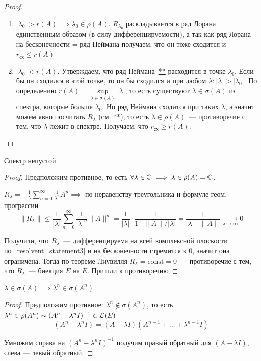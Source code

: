 \begin{proof}
\begin{enumerate}
    \item $|\lambda_0| > r(A) \implies \lambda_0 \in \rho(A)$. $R_{\lambda_0}$ раскладывается в ряд Лорана единственным образом (в силу дифференцируемости), а так как ряд Лорана на бесконечности = ряд Неймана получаем, что он тоже сходится и $r_{\text{сх}} \leqslant r(A)$
    \item $|\lambda_0| < r(A)$. Утверждаем, что ряд Неймана~\hyperlink{thm10.1-neihman}{**} расходится в точке $\lambda_0$. Если бы он сходился в этой точке, то он бы сходился и при любом $\lambda: |\lambda| > |\lambda_0|$. По определению $r(A)=\sup\limits_{\lambda \in \sigma(A)} |\lambda|$, то есть существуют $\lambda \in \sigma(A)$ из спектра, которые больше $\lambda_0$. Но ряд Неймана сходится при таких $\lambda$, а значит можем явно посчитать $R_\lambda$ (см. \hyperlink{thm10.1-neiman}{**}), то есть $\lambda \in \rho(A)$~--- противоречие с тем, что $\lambda$ лежит в спектре. Получаем, что $r_{\text{сх}} \geqslant r(A)$.
\end{enumerate}
\end{proof}
\begin{statement}[$5$]
    Спектр непустой
\end{statement}
\begin{proof}
    Предположим противное, то есть $\forall \lambda \in \mathbb{C} \implies \lambda \in \rho(A) = \mathbb{C}$.

    $R_\lambda = -\frac{1}{\lambda} \sum_{n=0}^\infty \frac{1}{\lambda^n} A^n \implies$ по неравенству треугольника и формуле геом. прогрессии
    \[\|R_\lambda\| \leq \frac{1}{|\lambda|} \sum_{n=0}^\infty \frac{1}{|\lambda|^n}\| A \|^n = \frac{1}{|\lambda|} \cdot \frac{1}{1-\|A\|/|\lambda|}=\frac{1}{|\lambda| - \|A\|} \xrightarrow[\lambda \to \infty]{} 0\]

    Получили, что $R_\lambda$~--- дифференцируема на всей комплексной плоскости по~\ref{resolvent_statement3} и на бесконечности стремится к 0, значит она ограничена. Тогда по теореме Лиувилля $R_\lambda=\text{const}=0$~--- противоречие с тем, что $R_\lambda$~--- биекция $E$ на $E$. Пришли к противоречию
\end{proof}

\begin{statement}[$6$]
    $\lambda \in \sigma(A) \implies \lambda^n \in \sigma(A^n)$
\end{statement}

\begin{proof}
    Предположим противное: $\lambda^n \not\in \sigma(A^n)$, то есть $\lambda^n \in \rho(A^n) \sim (A^n-\lambda^n I)^{-1} \in \mathcal{L}(E)$
    \[(A^n-\lambda^nI)=(A-\lambda I)(A^{n-1} + \ldots + \lambda^{n-1}I)\]

    Умножим справа на $(A^n-\lambda^n I)^{-1}$ получим правый обратный для $(A-\lambda I)$, слева --- левый обратный.
\end{proof}


